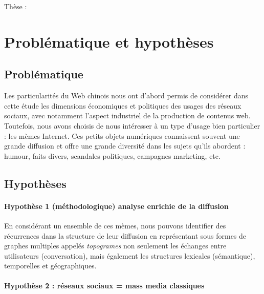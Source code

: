 
Thèse :


\chapter*{Problématique et hypothèses}

\section{Problématique} 
Les particularités du Web chinois nous ont d{\textquoteright}abord  permis de considérer dans cette étude les dimensions économiques  et politiques des usages des réseaux sociaux, avec notamment  l{\textquoteright}aspect industriel de la production de contenus web.  Toutefois, nous avons choisis de nous intéresser à un type  d{\textquoteright}usage bien particulier : les mèmes Internet. Ces  petits objets numériques connaissent souvent une grande diffusion et  offre une grande diversité dans les sujets qu{\textquoteright}ils  abordent : humour, faits divers, scandales politiques, campagnes  marketing, etc.    

\section{Hypothèses}

\subsubsection{Hypothèse 1 (méthodologique) analyse enrichie de la diffusion} 

En considérant un ensemble de ces mèmes, nous pouvons identifier des récurrences dans la structure de leur diffusion en représentant sous formes de graphes multiples appelés \textit{topogrames} non seulement les échanges entre utilisateurs (conversation), mais également les structures lexicales (sémantique), temporelles et géographiques.

\subsubsection{Hypothèse 2 : réseaux sociaux = mass media classiques} 

